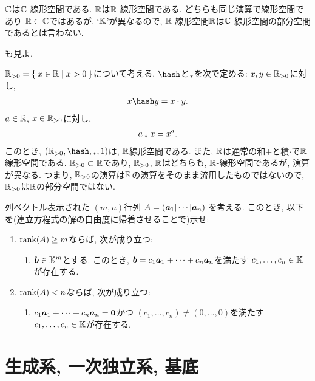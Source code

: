 \begin{example}
  \label{subsp:nonexample:cc}
  $\mathbb{C}$は$\mathbb{C}$-線形空間である.
  $\mathbb{R}$は$\mathbb{R}$-線形空間である.
  どちらも同じ演算で線形空間であり
  $\mathbb{R}\subset \mathbb{C}$ではあるが,
  `$\mathbb{K}$'が異なるので,
  $\mathbb{R}$-線形空間$\mathbb{R}$は$\mathbb{C}$-線形空間の部分空間であるとは言わない.

  も見よ.
\end{example}

\begin{example}
  $\mathbb{R}_{>0}=\Set{x\in\mathbb{R}|x>0}$について考える.
  $\pplus$と$\mathbin{{}_\ast}$を次で定める:
  $x,y\in\mathbb{R}_{>0}$に対し,
  \begin{align*}
    x\pplus y =x\cdot y.
  \end{align*}
  $a\in\mathbb{R}$, $x\in\mathbb{R}_{>0}$に対し,
  \begin{align*}
    a\mathbin{{}_\ast} x=x^a.
  \end{align*}
  このとき, $(\RR_{>0},\pplus,\aact,1)$は, $\mathbb{R}$線形空間である.
  また, $\mathbb{R}$は通常の和$+$と積$\cdot$で$\mathbb{R}$線形空間である.
  $\mathbb{R}_{>0}\subset \mathbb{R}$であり, $\mathbb{R}_{>0}$, $\mathbb{R}$はどちらも, $\mathbb{R}$-線形空間であるが, 演算が異なる.
  つまり, $\mathbb{R}_{>0}$の演算は$\mathbb{R}$の演算をそのまま流用したものではないので,
  $\mathbb{R}_{>0}$は$\mathbb{R}$の部分空間ではない.
\end{example}

\begin{quiz}
  列ベクトル表示された
  $(m,n)$行列
  $A=(\boldsymbol{a}_1|\cdots|\boldsymbol{a}_n)$
  を考える.
  このとき, 以下を(連立方程式の解の自由度に帰着させることで)示せ:
  \begin{enumerate}
  \item
    $\operatorname{rank}(A)\geq m$ならば,
   次が成り立つ:
   \begin{enumerate}
   \item $\boldsymbol{b}\in\mathbb{K}^m$とする.
     このとき, $\boldsymbol{b}=c_1\boldsymbol{a}_1+\cdots+c_n\boldsymbol{a}_n$を満たす
     $c_1,\ldots,c_n\in\mathbb{K}$が存在する.
   \end{enumerate}
  \item
    $\operatorname{rank}(A)< n$ならば,
   次が成り立つ:
   \begin{enumerate}
   \item 
     $c_1\boldsymbol{a}_1+\cdots+c_n\boldsymbol{a}_n=\boldsymbol{0}$かつ
     $(c_1,\ldots,c_n)\neq (0,\ldots,0)$を満たす
     $c_1,\ldots,c_n\in\mathbb{K}$が存在する.
   \end{enumerate}
  \end{enumerate}
\end{quiz}


\chapter{生成系, 一次独立系, 基底}
\label{chap:basis}
